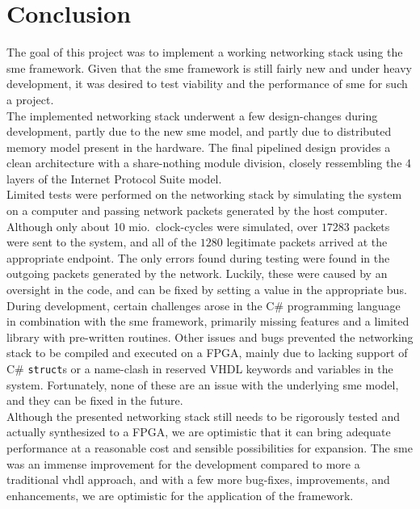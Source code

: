 \chapter{Conclusion}
\label{chap:conclusion}

The goal of this project was to implement a working networking stack using the
\gls{sme} framework. Given that the \gls{sme} framework is still fairly new and
under heavy development, it was desired to test viability and the performance
of \gls{sme} for such a project.\\

The implemented networking stack underwent a few design-changes during
development, partly due to the new \gls{sme} model, and partly due to
distributed memory model present in the hardware. The final pipelined design
provides a clean architecture with a share-nothing module division, closely
ressembling the 4 layers of the Internet Protocol Suite model.\\

Limited tests were performed on the networking stack by simulating the system
on a computer and passing network packets generated by the host computer.
Although only about 10 mio.\ clock-cycles were simulated, over $17283$ packets
were sent to the system, and all of the $1280$ legitimate packets arrived at the
appropriate endpoint. The only errors found during testing were found in the
outgoing packets generated by the network. Luckily, these were caused by an
oversight in the code, and can be fixed by setting a value in the appropriate
bus.\\

During development, certain challenges arose in the C\# programming language in
combination with the \gls{sme} framework, primarily missing features and a limited
library with pre-written routines. Other issues and bugs prevented the
networking stack to be compiled and executed on a FPGA, mainly due to lacking
support of C\# \texttt{struct}s or a name-clash in reserved VHDL keywords and
variables in the system. Fortunately, none of these are an issue with the underlying
\gls{sme} model, and they can be fixed in the future.\\

Although the presented networking stack still needs to be rigorously tested and
actually synthesized to a FPGA, we are optimistic that it can bring adequate
performance at a reasonable cost and sensible possibilities for expansion. The
\gls{sme} was an immense improvement for the development compared to more a
traditional \gls{vhdl} approach, and with a few more bug-fixes, improvements,
and enhancements, we are optimistic for the application of the framework.

